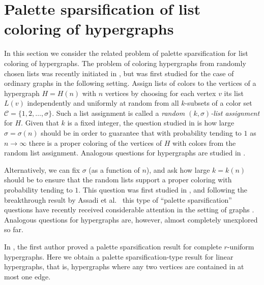 \documentclass[12pt]{article}
\newcommand{\1}{\mathds{1}}
\begin{document}



\section{Palette sparsification of list coloring of hypergraphs}

	In this section we consider the related problem of 
	palette sparsification for list coloring of hypergraphs.
	The problem of coloring hypergraphs from randomly chosen 
	lists was recently initiated in \cite{Casselgren5},
	but was first studied for the case of ordinary graphs
	in the following setting.
 Assign lists of 
    colors to the vertices of a hypergraph $H = H(n)$ with 
    $n$ vertices by choosing for
    each vertex $v$ its list $L(v)$ independently and 
    uniformly at random
	   from all $k$-subsets of a
	   color set $\mathcal{C} = \{1,2,\dots,\sigma\}$.
	   Such a list assignment is called a 
	   \emph{random $(k,\sigma)$-list assignment} for $H$.
	Given that $k$ is a fixed integer, the question studied in \cite{Casselgren, Casselgren2, Casselgren3, Casselgren4,
	HefetzKrivelevich, Krivelevich1, Krivelevich2} is
	how large $\sigma = \sigma(n)$
	should be
	in order to guarantee that with 
    probability tending to $1$ as $n \to \infty$ 
    there is a proper coloring
    of the vertices of $H$ with colors 
    from the random list assignment. Analogous questions for hypergraphs are studied in \cite{Casselgren5}.

	
	
	Alternatively, we can fix $\sigma$ 
    (as a function of $n$), and ask how large $k=k(n)$ should be 
    to ensure that
    the random lists support a proper coloring with probability 
    tending to $1$.
	This question was first studied in
	\cite{AndrenCasselgrenOhman, CasselgrenHaggkvist}, and
	following the breakthrough result by Assadi et al.\ \cite{AssadiChenKhanna}
	this type of ``palette sparsification'' questions have recently
	received considerable attention in the setting of graphs
	\cite{AlonAssadi, Dhawan, JainPham, KahnKenney, KahnKenney2, KangKellyKuhnMethukuOsthus, 
	Keevash,  LuriaSimkin}.
	Analogous questions for hypergraphs are, however, almost completely unexplored so far.
	
	In \cite{Casselgren5}, the first author
	proved a palette sparsification result for complete $r$-uniform hypergraphs.
	Here we obtain a palette sparsification-type result for linear hypergraphs, that is,
	hypergraphs where any two vertices are contained in at most one edge.
\end{document}
